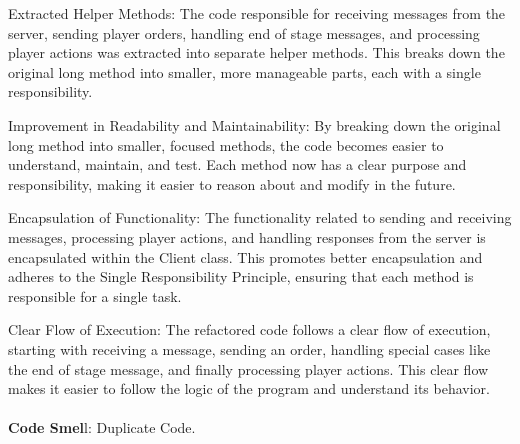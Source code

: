 \documentclass[12pt]{article}
\numberwithin{table}{section}
\begin{document}
Extracted Helper Methods:
The code responsible for receiving messages from the server, sending player orders, handling end of stage messages, and processing player actions was extracted into separate helper methods. This breaks down the original long method into smaller, more manageable parts, each with a single responsibility.

Improvement in Readability and Maintainability:
By breaking down the original long method into smaller, focused methods, the code becomes easier to understand, maintain, and test. Each method now has a clear purpose and responsibility, making it easier to reason about and modify in the future.

Encapsulation of Functionality:
The functionality related to sending and receiving messages, processing player actions, and handling responses from the server is encapsulated within the Client class. This promotes better encapsulation and adheres to the Single Responsibility Principle, ensuring that each method is responsible for a single task.

Clear Flow of Execution:
The refactored code follows a clear flow of execution, starting with receiving a message, sending an order, handling special cases like the end of stage message, and finally processing player actions. This clear flow makes it easier to follow the logic of the program and understand its behavior.\\
\\
\textbf{Code Smel}l: Duplicate Code.
\end{document}
